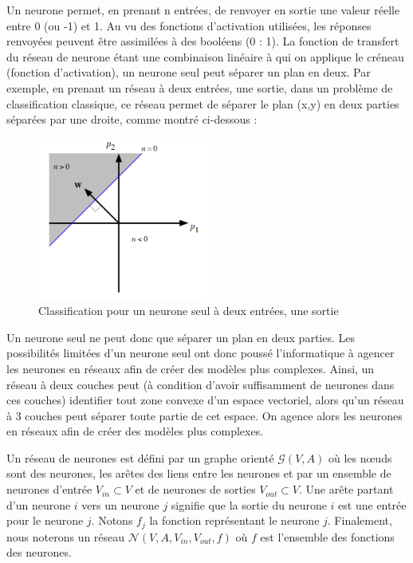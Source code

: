 Un neurone permet, en prenant n entrées, de renvoyer en sortie une valeur réelle entre 0 (ou -1) et 1. Au vu des fonctions d'activation utilisées, les réponses renvoyées peuvent être assimilées à des booléens (0 : 1). La fonction de transfert du réseau de neurone étant une combinaison linéaire à qui on applique le créneau (fonction d'activation), un neurone seul peut séparer un plan en deux. 
Par exemple, en prenant un réseau à deux entrées, une sortie, dans un problème de classification classique, ce réseau permet de séparer le plan (x,y) en deux parties séparées par une droite, comme montré ci-dessous :

\begin{figure}[h]
\begin{center}
\includegraphics[width=0.5\textwidth]{images/decisionNeuroneSeul.png}\caption{Classification pour un neurone seul à deux entrées, une sortie}
\end{center}
\end{figure} 

Un neurone seul ne peut donc que séparer un plan en deux parties. Les possibilités limitées d'un neurone seul ont donc poussé l'informatique à agencer les neurones en réseaux afin de créer des modèles plus complexes. Ainsi, un réseau à deux couches peut (à condition d'avoir suffisamment de neurones dans ces couches) identifier tout zone convexe d'un espace vectoriel, alors qu'un réseau à 3 couches peut séparer toute partie de cet espace. On agence alors les neurones en réseaux afin de créer des modèles plus complexes. \\

\begin{definition} 
Un réseau de neurones est défini par un graphe orienté $\mathcal{G}(V, A)$ où les n\oe{}uds sont des neurones, les arêtes des liens entre les neurones et par un ensemble de neurones d'entrée $V_{in} \subset V$ et de neurones de sorties $V_{out} \subset V$. Une arête partant d'un neurone $i$ vers un neurone $j$ signifie que la sortie du neurone $i$ est une entrée pour le neurone $j$. Notons $f_{j}$ la fonction représentant le neurone $j$. Finalement, nous noterons un réseau $\mathcal{N}(V, A, V_{in}, V_{out}, f)$ où $f$ est l'ensemble des fonctions des neurones.\\
\end{definition}

